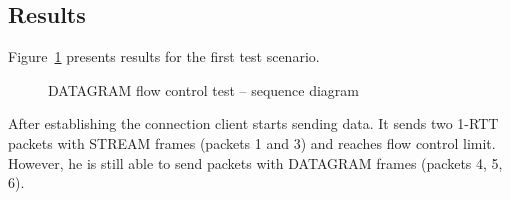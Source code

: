 \subsection{Results}
\label{subsec:results2}
Figure~\ref{fig:dgram_flow_control} presents results for the first test scenario.


\begin{figure}[h]
    \centering
    \begin{sequencediagram}
    \end{sequencediagram}
    \caption{DATAGRAM flow control test -- sequence diagram}
    \label{fig:dgram_flow_control}
\end{figure}



After establishing the connection client starts sending data.
It sends two 1-RTT packets with STREAM frames (packets 1 and 3) and reaches flow control limit.
However, he is still able to send packets with DATAGRAM frames (packets 4, 5, 6).


